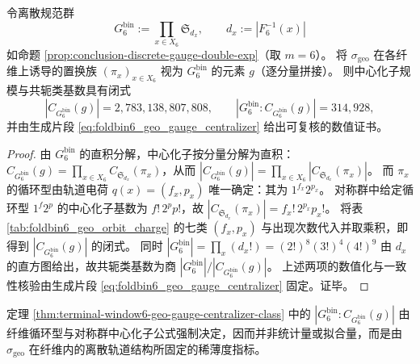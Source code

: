 \begin{theorem}\label{thm:terminal-window6-geo-gauge-centralizer-class}
令离散规范群
\[
G^{\mathrm{bin}}_6:=\prod_{x\in X_6}\mathfrak{S}_{d_x},
\qquad d_x:=|F_6^{-1}(x)|
\]
如命题 \ref{prop:conclusion-discrete-gauge-double-exp}（取 \(m=6\)）。
将 \(\sigma_{\mathrm{geo}}\) 在各纤维上诱导的置换族 \((\pi_x)_{x\in X_6}\) 视为 \(G^{\mathrm{bin}}_6\) 的元素 \(g\)（逐分量拼接）。
则中心化子规模与共轭类基数具有闭式
\[
|C_{G^{\mathrm{bin}}_6}(g)|=2{,}783{,}138{,}807{,}808,
\qquad
|G^{\mathrm{bin}}_6:C_{G^{\mathrm{bin}}_6}(g)|=314{,}928,
\]
并由生成片段 \eqref{eq:foldbin6_geo_gauge_centralizer} 给出可复核的数值证书。
\end{theorem}
\begin{proof}
由 \(G^{\mathrm{bin}}_6\) 的直积分解，中心化子按分量分解为直积：
\(
C_{G^{\mathrm{bin}}_6}(g)=\prod_{x\in X_6}C_{\mathfrak S_{d_x}}(\pi_x)
\)，从而
\(
|C_{G^{\mathrm{bin}}_6}(g)|=\prod_{x\in X_6}|C_{\mathfrak S_{d_x}}(\pi_x)|
\)。
而 \(\pi_x\) 的循环型由轨道电荷 \(q(x)=(f_x,p_x)\) 唯一确定：其为 \(1^{f_x}2^{p_x}\)。
对称群中给定循环型 \(1^{f}2^{p}\) 的中心化子基数为 \(f!\,2^{p}p!\)，故 \(|C_{\mathfrak S_{d_x}}(\pi_x)|=f_x!\,2^{p_x}p_x!\)。
将表 \ref{tab:foldbin6_geo_orbit_charge} 的七类 \((f_x,p_x)\) 与出现次数代入并取乘积，即得到 \(|C_{G^{\mathrm{bin}}_6}(g)|\) 的闭式。
同时 \(|G^{\mathrm{bin}}_6|=\prod_x (d_x!)=(2!)^8(3!)^4(4!)^9\) 由 \(d_x\) 的直方图给出，故共轭类基数为商 \(|G^{\mathrm{bin}}_6|/|C_{G^{\mathrm{bin}}_6}(g)|\)。
上述两项的数值化与一致性核验由生成片段 \eqref{eq:foldbin6_geo_gauge_centralizer} 固定。证毕。
\end{proof}


\begin{remark}\label{rem:terminal-window6-geo-gauge-conjugacy-rigidity}
定理 \ref{thm:terminal-window6-geo-gauge-centralizer-class} 中的 \(|G^{\mathrm{bin}}_6:C_{G^{\mathrm{bin}}_6}(g)|\) 由纤维循环型与对称群中心化子公式强制决定，因而并非统计量或拟合量，而是由 \(\sigma_{\mathrm{geo}}\) 在纤维内的离散轨道结构所固定的稀薄度指标。
\end{remark}

